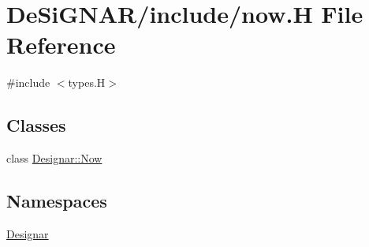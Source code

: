 \hypertarget{now_8_h}{}\section{De\+Si\+G\+N\+A\+R/include/now.H File Reference}
\label{now_8_h}
{\ttfamily \#include $<$types.\+H$>$}\newline
\subsection*{Classes}
\begin{DoxyCompactItemize}
\item 
class \hyperlink{class_designar_1_1_now}{Designar\+::\+Now}
\end{DoxyCompactItemize}
\subsection*{Namespaces}
\begin{DoxyCompactItemize}
\item 
 \hyperlink{namespace_designar}{Designar}
\end{DoxyCompactItemize}
